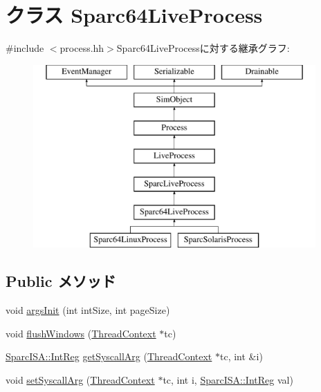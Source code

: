\hypertarget{classSparc64LiveProcess}{
\section{クラス Sparc64LiveProcess}
\label{classSparc64LiveProcess}
}


{\ttfamily \#include $<$process.hh$>$}Sparc64LiveProcessに対する継承グラフ:\begin{figure}[H]
\begin{center}
\leavevmode
\includegraphics[height=7cm]{classSparc64LiveProcess}
\end{center}
\end{figure}
\subsection*{Public メソッド}
\begin{DoxyCompactItemize}
\item 
void \hyperlink{classSparc64LiveProcess_a60e5314ffeede1e51c6bcb2cf606ca92}{argsInit} (int intSize, int pageSize)
\item 
void \hyperlink{classSparc64LiveProcess_ac36137c98f2b65736e0c5745c3c90c85}{flushWindows} (\hyperlink{classThreadContext}{ThreadContext} $\ast$tc)
\item 
\hyperlink{namespaceSparcISA_a0e080577527fb3e9685399f75b5caf15}{SparcISA::IntReg} \hyperlink{classSparc64LiveProcess_abab14482db5480cf54186cb10b08491e}{getSyscallArg} (\hyperlink{classThreadContext}{ThreadContext} $\ast$tc, int \&i)
\item 
void \hyperlink{classSparc64LiveProcess_acab5265ebb2016965a75bd93006c36d3}{setSyscallArg} (\hyperlink{classThreadContext}{ThreadContext} $\ast$tc, int i, \hyperlink{namespaceSparcISA_a0e080577527fb3e9685399f75b5caf15}{SparcISA::IntReg} val)
\end{DoxyCompactItemize}
